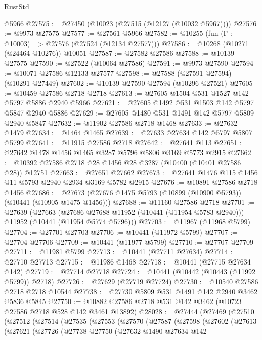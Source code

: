 \begin{lexlean}{RustStd}
\begin{coremodule}
    @5966
@27575 := @27450 (@10023 (@27515 (@12127 (@10032 @5967))))
@27576 := @9973 @27575
@27577 := @27561 @5966
@27582 := @10255 (fun (Γ : @10003) => @27576 (@27524 (@12134 @27577)))
@27586 := @10268 (@10271 (@24464 @10276)) @10051
@27587 := @27582 @27586
@27588 := @10139 @27575
@27590 := @27522 (@10064 @27586)
@27591 := @9973 @27590
@27594 := @10071 @27586 @12133 @27577
@27598 := @27588 (@27591 @27594) (@10291 @27449)
@27602 := @10139 @27590 @27594 (@10296 @27521)
@27605 := @10459 @27586 @2718 @2718
@27613 := @27605 @1504 @531 @1527 @142 @5797 @5886 @2940 @5966
@27621 := @27605 @1492 @531 @1503 @142 @5797 @5847 @2940 @5886
@27629 := @27605 @1480 @531 @1491 @142 @5797 @5809 @2940 @5847
@27632 := @11902 @27586 @2718 @1468
@27633 := @27632 @1479
@27634 := @1464 @1465
@27639 := @27633 @27634 @142 @5797 @5807 @5799
@27641 := @11915 @27586 @2718
@27642 := @27641 @113
@27651 := @27642 @1478 @1456 @1465 @3287 @5796 @5806 @3169 @5773 @2915
@27662 := @10392 @27586 @2718 @28 @1456 @28 @3287 (@10400 (@10401 @27586 @28)) @12751
@27663 := @27651 @27662
@27673 := @27641 @1476 @115 @1456 @11 @5793 @2940 @2934 @3169 @5782 @2915
@27676 := @10891 @27586 @2718 @1456
@27686 := @27673 (@27676 @1475 @5793 (@10899 (@10900 @5793)) (@10441 (@10905 @1475 @1456)))
@27688 := @11160 @27586 @2718
@27701 := @27639
    (@27663
      (@27686 @27688 @11952 (@10441 (@11954 @5783 @2940)))
      @11952
      (@10441 (@11954 @5774 @5796)))
@27703 := @11967 (@11968 @5799)
@27704 := @27701 @27703
@27706 := @10441 (@11972 @5799)
@27707 := @27704 @27706
@27709 := @10441 (@11977 @5799)
@27710 := @27707 @27709
@27711 := @11981 @5799
@27713 := @10441 (@27711 @27634)
@27714 := @27710 @27713
@27715 := @11986 @1468
@27718 := @10441 (@27715 @27634 @142)
@27719 := @27714 @27718
@27724 := @10441 (@10442 (@10443 (@11992 @5799)) @2718)
@27726 := @27629 (@27719 @27724)
@27730 := @10540 @27586 @2718 @2718 @10544
@27738 := @27730 @5809 @531 @1491 @142 @2940 @3462 @5836 @5845
@27750 := @10882 @27586 @2718 @531 @142 @3462 (@10723 @27586 @2718 @528 @142 @3461 @13892)
@28028 := @27444
    (@27469
      (@27510
        (@27512
          (@27514
            (@27535
              (@27553
                (@27570
                  (@27587
                    (@27598
                      (@27602
                        (@27613
                          (@27621
                            (@27726
                              (@27738
                                @27750
                                (@27632
                                  @1490
                                  @27634
                                  @142

\end{coremodule}
\end{lexlean}
